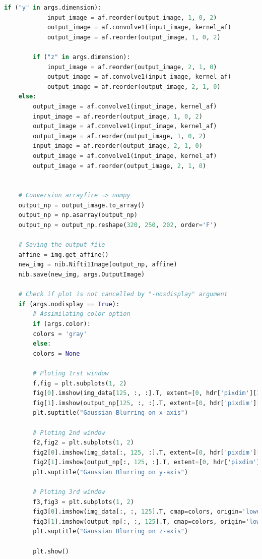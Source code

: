 \documentclass[10pt]{report}
\begin{document}
\begin{appendix}
\begin{lstlisting}[language=python]
		if ("y" in args.dimension):
			input_image = af.reorder(output_image, 1, 0, 2)
			output_image = af.convolve1(input_image, kernel_af)
			output_image = af.reorder(output_image, 1, 0, 2)
		
		if ("z" in args.dimension):
			input_image = af.reorder(output_image, 2, 1, 0)
			output_image = af.convolve1(input_image, kernel_af)
			output_image = af.reorder(output_image, 2, 1, 0)
	else:
		output_image = af.convolve1(input_image, kernel_af)
		input_image = af.reorder(output_image, 1, 0, 2)
		output_image = af.convolve1(input_image, kernel_af)
		output_image = af.reorder(output_image, 1, 0, 2)
		input_image = af.reorder(output_image, 2, 1, 0)
		output_image = af.convolve1(input_image, kernel_af)
		output_image = af.reorder(output_image, 2, 1, 0)
	
	
	# Conversion arrayfire => numpy
	output_np = output_image.to_array()
	output_np = np.asarray(output_np)
	output_np = output_np.reshape(320, 250, 202, order='F')
	
	# Saving the output file
	affine = img.get_affine()
	new_img = nib.Nifti1Image(output_np, affine)
	nib.save(new_img, args.OutputImage)
	
	# Check if plot is not cancelled by "-nosdisplay" argument
	if (args.nodisplay == True):
		# Assimilating color option
		if (args.color):
		colors = 'gray'
		else:
		colors = None
		
		# Ploting 1rst window
		f,fig = plt.subplots(1, 2)
		fig[0].imshow(img_data[125, :, :].T, extent=[0, hdr['pixdim'][1], 0, hdr['pixdim'][3]], cmap=colors, origin='lower')
		fig[1].imshow(output_np[125, :, :].T, extent=[0, hdr['pixdim'][1], 0, hdr['pixdim'][3]], cmap=colors, origin='lower')
		plt.suptitle("Gaussian Blurring on x-axis")
		
		# Ploting 2nd window
		f2,fig2 = plt.subplots(1, 2)
		fig2[0].imshow(img_data[:, 125, :].T, extent=[0, hdr['pixdim'][1], 0, hdr['pixdim'][3]], cmap=colors, origin='lower')
		fig2[1].imshow(output_np[:, 125, :].T, extent=[0, hdr['pixdim'][1], 0, hdr['pixdim'][3]], cmap=colors, origin='lower')
		plt.suptitle("Gaussian Blurring on y-axis")
		
		# Ploting 3rd window
		f3,fig3 = plt.subplots(1, 2)
		fig3[0].imshow(img_data[:, :, 125].T, cmap=colors, origin='lower')
		fig3[1].imshow(output_np[:, :, 125].T, cmap=colors, origin='lower')
		plt.suptitle("Gaussian Blurring on z-axis")
		
		plt.show()
	\end{lstlisting}
\end{appendix}
\end{document}
